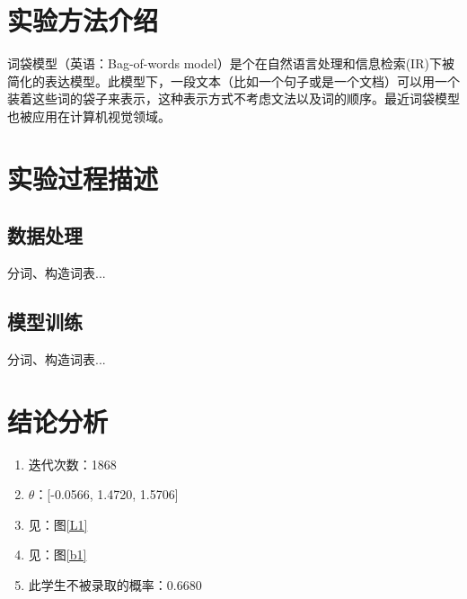 \documentclass{sdureport}
\begin{document}
\begin{sduDocument}	

	\section{实验方法介绍}
	
	词袋模型（英语：Bag-of-words model）是个在自然语言处理和信息检索(IR)下被简化的表达模型。此模型下，一段文本（比如一个句子或是一个文档）可以用一个装着这些词的袋子来表示，这种表示方式不考虑文法以及词的顺序。最近词袋模型也被应用在计算机视觉领域。

	\section{实验过程描述}
	
	\subsection{数据处理}
	
	分词、构造词表...
	
	\subsection{模型训练}
	
	分词、构造词表...
	
	\section{结论分析}
	
	\begin{enumerate}
		\item 迭代次数：1868
		\item $\theta$：[-0.0566, 1.4720, 1.5706]
		\item 见：图\ref{L1}
		\item 见：图\ref{b1}
		\item 此学生不被录取的概率：0.6680
	\end{enumerate}
	

\end{sduDocument}
\end{document}
